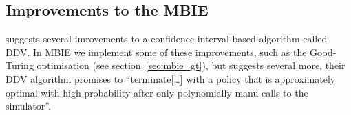 \subsection{Improvements to the MBIE }

\textcite{dietterich2013pac} suggests several imrovements to a confidence interval based algorithm called DDV. In MBIE we implement some of these improvements, such as the Good-Turing optimisation (see section~\ref{sec:mbie_gt}), but \textcite{dietterich2013pac} suggests several more, their DDV algorithm promises to ``terminate[\ldots] with a policy that is approximately optimal with high probability after only polynomially manu calls to the simulator''.
